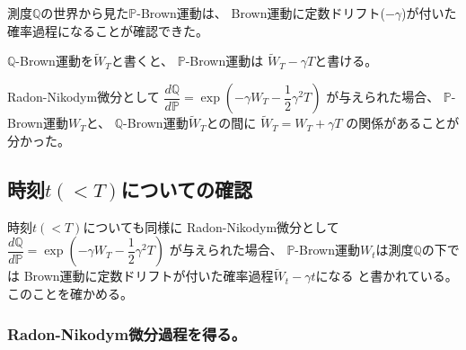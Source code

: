 \documentclass[uplatex,a4j,12pt,dvipdfmx]{jsarticle}
\begin{document}
測度$\mathbb{Q}$の世界から見た$\mathbb{P}$-Brown運動は、
Brown運動に定数ドリフト($-\gamma$)が付いた確率過程になることが確認できた。

$\mathbb{Q}$-Brown運動を$\tilde{W}_{T}$と書くと、
$\mathbb{P}$-Brown運動は
$\tilde{W}_{T} - \gamma T$と書ける。

Radon-Nikodym微分として
$
	\dfrac{ d \mathbb{Q} }{ d \mathbb{P} }
	=
	\exp \left( - \gamma W_{T} - \dfrac{1}{2} \gamma^{2} T \right)
$
が与えられた場合、
$\mathbb{P}$-Brown運動$W_{T}$と、
$\mathbb{Q}$-Brown運動$\tilde{W}_{T}$との間に
$\tilde{W}_{T} = W_{T} + \gamma T$
の関係があることが分かった。

\subsection{時刻$t(<T)$についての確認}

時刻$t(<T)$についても同様に
Radon-Nikodym微分として
$
	\dfrac{ d \mathbb{Q} }{ d \mathbb{P} }
	=
	\exp \left( - \gamma W_{T} - \dfrac{1}{2} \gamma^{2} T \right)
$
が与えられた場合、
$\mathbb{P}$-Brown運動$W_{t}$は測度$\mathbb{Q}$の下では
Brown運動に定数ドリフトが付いた確率過程$\tilde{W}_{t} - \gamma t$になる
と書かれている。
このことを確かめる。
${}$

\subsubsection{Radon-Nikodym微分過程を得る。}
\end{document}
